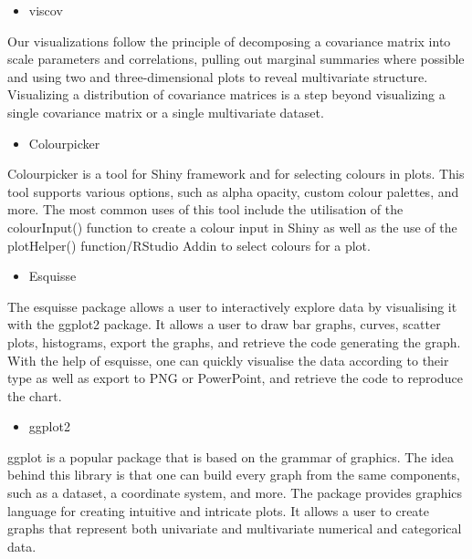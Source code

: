 \documentclass[
]{report}
\providecommand{\tightlist}{%
  \setlength{\itemsep}{0pt}\setlength{\parskip}{0pt}}
\begin{document}
\begin{itemize}
\tightlist
\item
  viscov
\end{itemize}

Our visualizations follow the principle of decomposing a covariance matrix into scale parameters and correlations, pulling out marginal summaries where possible and using two and three-dimensional plots to reveal multivariate structure. Visualizing a distribution of covariance matrices is a step beyond visualizing a single covariance matrix or a single multivariate dataset.

\begin{itemize}
\tightlist
\item
  Colourpicker
\end{itemize}

Colourpicker is a tool for Shiny framework and for selecting colours in plots. This tool supports various options, such as alpha opacity, custom colour palettes, and more. The most common uses of this tool include the utilisation of the colourInput() function to create a colour input in Shiny as well as the use of the plotHelper() function/RStudio Addin to select colours for a plot.

\begin{itemize}
\tightlist
\item
  Esquisse
\end{itemize}

The esquisse package allows a user to interactively explore data by visualising it with the ggplot2 package. It allows a user to draw bar graphs, curves, scatter plots, histograms, export the graphs, and retrieve the code generating the graph. With the help of esquisse, one can quickly visualise the data according to their type as well as export to PNG or PowerPoint, and retrieve the code to reproduce the chart.

\begin{itemize}
\tightlist
\item
  ggplot2
\end{itemize}

ggplot is a popular package that is based on the grammar of graphics. The idea behind this library is that one can build every graph from the same components, such as a dataset, a coordinate system, and more. The package provides graphics language for creating intuitive and intricate plots. It allows a user to create graphs that represent both univariate and multivariate numerical and categorical data.
\end{document}
